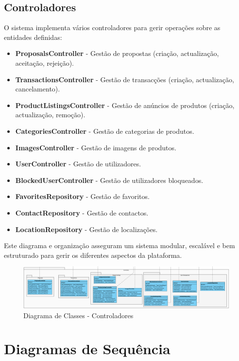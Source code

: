 \documentclass[a4paper, 12pt]{article} %
\begin{document}
\subsection{Controladores}
O sistema implementa vários controladores para gerir operações sobre as entidades definidas:
\begin{itemize}
	\item \textbf{ProposalsController} - Gestão de propostas (criação, actualização, aceitação, rejeição).
	\item \textbf{TransactionsController} - Gestão de transacções (criação, actualização, cancelamento).
	\item \textbf{ProductListingsController} - Gestão de anúncios de produtos (criação, actualização, remoção).
	\item \textbf{CategoriesController} - Gestão de categorias de produtos.
	\item \textbf{ImagesController} - Gestão de imagens de produtos.
	\item \textbf{UserController} - Gestão de utilizadores.
	\item \textbf{BlockedUserController} - Gestão de utilizadores bloqueados.
	\item \textbf{FavoritesRepository} - Gestão de favoritos.
	\item \textbf{ContactRepository} - Gestão de contactos.
	\item \textbf{LocationRepository} - Gestão de localizações.
\end{itemize}

Este diagrama e organização asseguram um sistema modular, escalável e bem estruturado para gerir os diferentes aspectos da plataforma.

\begin{figure}[ht]
	\centering
	\includegraphics[width=\textwidth]{../images/class-diagram-controllers.png}
	\caption{Diagrama de Classes - Controladores}
	\label{fig:class_diagram_controllers}
\end{figure}

\newpage
\section*{Diagramas de Sequência}
\end{document}
